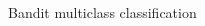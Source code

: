 \documentclass{beamer}
\begin{document}
\begin{frame}{Bandit multiclass classification}
\begin{minipage}{0.35\textwidth}
\begin{columns}
\begin{column}{0.35\textwidth}
\end{column}
\begin{column}{0.3\textwidth}
\\
\centering
{}
\\
\\
\end{column}
\begin{column}{0.35\textwidth}
\vspace{0.3cm}

\end{column}
\end{columns}
\end{minipage}
\end{frame}
\end{document}
